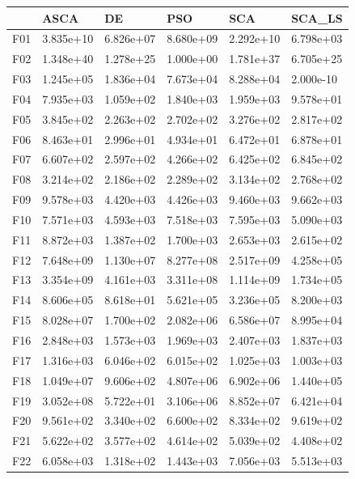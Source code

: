 \begin{tabular}{llllll}
\toprule
{} &       ASCA &         DE &        PSO &        SCA &     SCA\_LS \\
\midrule
F01  &  3.835e+10 &  6.826e+07 &  8.680e+09 &  2.292e+10 &  6.798e+03 \\
F02  &  1.348e+40 &  1.278e+25 &  1.000e+00 &  1.781e+37 &  6.705e+25 \\
F03  &  1.245e+05 &  1.836e+04 &  7.673e+04 &  8.288e+04 &  2.000e-10 \\
F04  &  7.935e+03 &  1.059e+02 &  1.840e+03 &  1.959e+03 &  9.578e+01 \\
F05  &  3.845e+02 &  2.263e+02 &  2.702e+02 &  3.276e+02 &  2.817e+02 \\
F06  &  8.463e+01 &  2.996e+01 &  4.934e+01 &  6.472e+01 &  6.878e+01 \\
F07  &  6.607e+02 &  2.597e+02 &  4.266e+02 &  6.425e+02 &  6.845e+02 \\
F08  &  3.214e+02 &  2.186e+02 &  2.289e+02 &  3.134e+02 &  2.768e+02 \\
F09  &  9.578e+03 &  4.420e+03 &  4.426e+03 &  9.460e+03 &  9.662e+03 \\
F10  &  7.571e+03 &  4.593e+03 &  7.518e+03 &  7.595e+03 &  5.090e+03 \\
F11  &  8.872e+03 &  1.387e+02 &  1.700e+03 &  2.653e+03 &  2.615e+02 \\
F12  &  7.648e+09 &  1.130e+07 &  8.277e+08 &  2.517e+09 &  4.258e+05 \\
F13  &  3.354e+09 &  4.161e+03 &  3.311e+08 &  1.114e+09 &  1.734e+05 \\
F14  &  8.606e+05 &  8.618e+01 &  5.621e+05 &  3.236e+05 &  8.200e+03 \\
F15  &  8.028e+07 &  1.700e+02 &  2.082e+06 &  6.586e+07 &  8.995e+04 \\
F16  &  2.848e+03 &  1.573e+03 &  1.969e+03 &  2.407e+03 &  1.837e+03 \\
F17  &  1.316e+03 &  6.046e+02 &  6.015e+02 &  1.025e+03 &  1.003e+03 \\
F18  &  1.049e+07 &  9.606e+02 &  4.807e+06 &  6.902e+06 &  1.440e+05 \\
F19  &  3.052e+08 &  5.722e+01 &  3.106e+06 &  8.852e+07 &  6.421e+04 \\
F20  &  9.561e+02 &  3.340e+02 &  6.600e+02 &  8.334e+02 &  9.619e+02 \\
F21  &  5.622e+02 &  3.577e+02 &  4.614e+02 &  5.039e+02 &  4.408e+02 \\
F22  &  6.058e+03 &  1.318e+02 &  1.443e+03 &  7.056e+03 &  5.513e+03 \\

\end{tabular}
